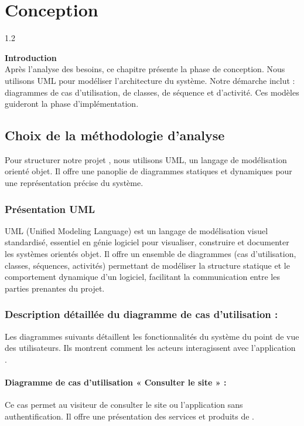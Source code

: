\chapter{Conception}
\begin{spacing}{1.2}
\minitoc
\thispagestyle{MyStyle}
\end{spacing}
\newpage

{\Large\bfseries Introduction}\\
Après l’analyse des besoins, ce chapitre présente la phase de conception. Nous utilisons UML
pour modéliser l’architecture du système. Notre démarche inclut : diagrammes de cas d’utilisation,
de classes, de séquence et d’activité. Ces modèles guideront la phase d’implémentation.
\section{Choix de la méthodologie d'analyse}
Pour structurer notre projet \reportAppName{}, nous utilisons UML, un langage de modélisation
orienté objet. Il offre une panoplie de diagrammes statiques et dynamiques pour une représentation
précise du système.
\subsection{Présentation UML}
UML (Unified Modeling Language) est un langage de modélisation visuel standardisé, essentiel
en génie logiciel pour visualiser, construire et documenter les systèmes orientés objet. Il offre
un ensemble de diagrammes (cas d’utilisation, classes, séquences, activités) permettant de
modéliser la structure statique et le comportement dynamique d’un logiciel, facilitant la communication
entre les parties prenantes du projet.
\subsection{Description détaillée du diagramme de cas d'utilisation : }
Les diagrammes suivants détaillent les fonctionnalités du système du point de vue des utilisateurs. Ils
montrent comment les acteurs interagissent avec l'application \reportAppName{}.
\subsubsection{Diagramme de cas d'utilisation « Consulter le site » :}
Ce cas permet au visiteur de consulter le site ou l’application \reportAppName sans authentification.
Il offre une présentation des services et produits de \reportEntreprise{}.\\

